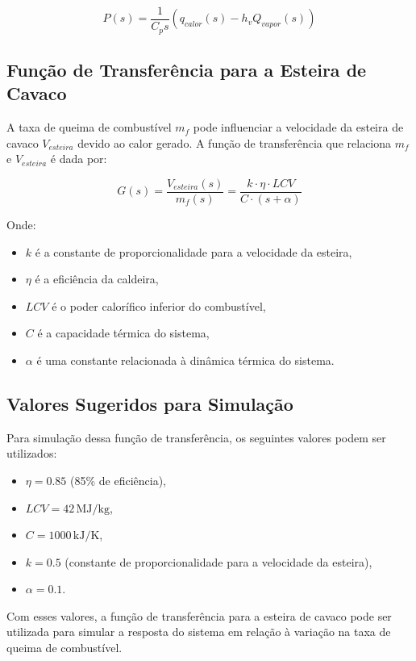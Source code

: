 \documentclass{article}
\begin{document}
\begin{equation}
    P(s) = \frac{1}{C_p s} (q_{calor}(s) - h_v Q_{vapor}(s))
\end{equation}

\subsection{Função de Transferência para a Esteira de Cavaco}
A taxa de queima de combustível \( m_f \) pode influenciar a velocidade da esteira de cavaco \( V_{esteira} \) devido ao calor gerado. A função de transferência que relaciona \( m_f \) e \( V_{esteira} \) é dada por:

\[
G(s) = \frac{V_{esteira}(s)}{m_f(s)} = \frac{k \cdot \eta \cdot LCV}{C \cdot (s + \alpha)}
\]

Onde:
\begin{itemize}
    \item \( k \) é a constante de proporcionalidade para a velocidade da esteira,
    \item \( \eta \) é a eficiência da caldeira,
    \item \( LCV \) é o poder calorífico inferior do combustível,
    \item \( C \) é a capacidade térmica do sistema,
    \item \( \alpha \) é uma constante relacionada à dinâmica térmica do sistema.
\end{itemize}

\subsection{Valores Sugeridos para Simulação}
Para simulação dessa função de transferência, os seguintes valores podem ser utilizados:
\begin{itemize}
    \item \( \eta = 0.85 \) (85\% de eficiência),
    \item \( LCV = 42 \, \text{MJ/kg} \),
    \item \( C = 1000 \, \text{kJ/K} \),
    \item \( k = 0.5 \) (constante de proporcionalidade para a velocidade da esteira),
    \item \( \alpha = 0.1 \).
\end{itemize}

Com esses valores, a função de transferência para a esteira de cavaco pode ser utilizada para simular a resposta do sistema em relação à variação na taxa de queima de combustível.
\end{document}
